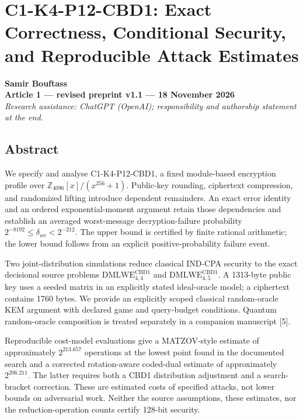 \documentclass[
  10pt,
  a4paper,
]{article}
\author{}
\date{}
\begin{document}

\section{C1-K4-P12-CBD1: Exact Correctness, Conditional Security, and
Reproducible Attack
Estimates}\label{c1-k4-p12-cbd1-exact-correctness-conditional-security-and-reproducible-attack-estimates}

\textbf{Samir Bouftass}\\
\textbf{Article 1 --- revised preprint v1.1 --- 18 November 2026}\\
\emph{Research assistance: ChatGPT (OpenAI); responsibility and
authorship statement at the end.}

\subsection{Abstract}\label{abstract}

We specify and analyse C1-K4-P12-CBD1, a fixed module-based encryption
profile over \(\mathbb Z_{4096}[x]/(x^{256}+1)\). Public-key rounding,
ciphertext compression, and randomized lifting introduce dependent
remainders. An exact error identity and an ordered exponential-moment
argument retain those dependencies and establish an averaged
worst-message decryption-failure probability
\(2^{-8192}\le\delta_{wc}<2^{-212}\). The upper bound is certified by
finite rational arithmetic; the lower bound follows from an explicit
positive-probability failure event.

Two joint-distribution simulations reduce classical IND-CPA security to
the exact decisional source problems
\(\mathrm{DMLWE}_{4,4}^{\mathrm{CBD1}}\) and
\(\mathrm{DMLWE}_{4,5}^{\mathrm{CBD1}}\). A 1313-byte public key uses a
seeded matrix in an explicitly stated ideal-oracle model; a ciphertext
contains 1760 bytes. We provide an explicitly scoped classical
random-oracle KEM argument with declared game and query-budget
conditions. Quantum random-oracle composition is treated separately in a
companion manuscript {[}5{]}.

Reproducible cost-model evaluations give a MATZOV-style estimate of
approximately \(2^{213.657}\) operations at the lowest point found in
the documented search and a corrected rotation-aware coded-dual estimate
of approximately \(2^{206.211}\). The latter requires both a CBD1
distribution adjustment and a search-bracket correction. These are
estimated costs of specified attacks, not lower bounds on adversarial
work. Neither the source assumptions, these estimates, nor the
reduction-operation counts certify 128-bit security.
\end{document}
